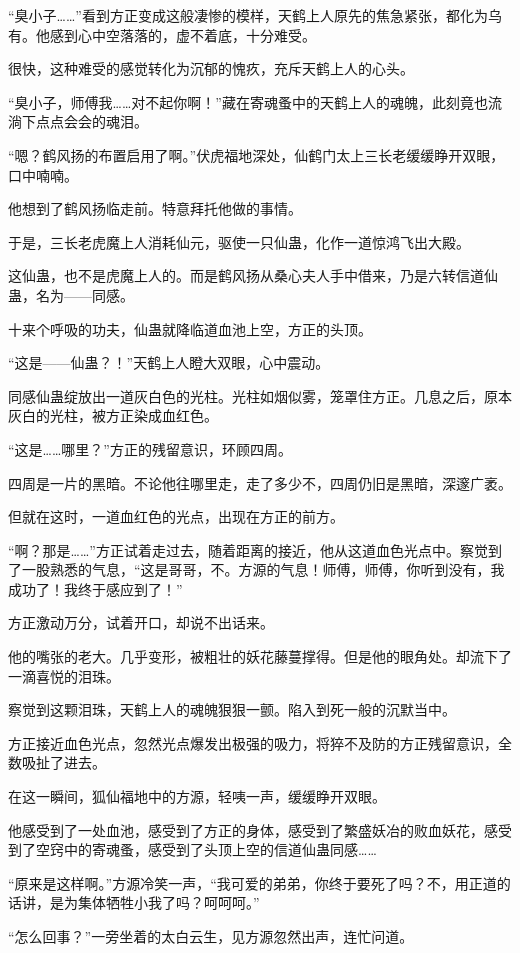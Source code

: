 \begin{this_body}
“臭小子……”看到方正变成这般凄惨的模样，天鹤上人原先的焦急紧张，都化为乌有。他感到心中空落落的，虚不着底，十分难受。

很快，这种难受的感觉转化为沉郁的愧疚，充斥天鹤上人的心头。

“臭小子，师傅我……对不起你啊！”藏在寄魂蚤中的天鹤上人的魂魄，此刻竟也流淌下点点会会的魂泪。

“嗯？鹤风扬的布置启用了啊。”伏虎福地深处，仙鹤门太上三长老缓缓睁开双眼，口中喃喃。

他想到了鹤风扬临走前。特意拜托他做的事情。

于是，三长老虎魔上人消耗仙元，驱使一只仙蛊，化作一道惊鸿飞出大殿。

这仙蛊，也不是虎魔上人的。而是鹤风扬从桑心夫人手中借来，乃是六转信道仙蛊，名为——同感。

十来个呼吸的功夫，仙蛊就降临道血池上空，方正的头顶。

“这是——仙蛊？！”天鹤上人瞪大双眼，心中震动。

同感仙蛊绽放出一道灰白色的光柱。光柱如烟似雾，笼罩住方正。几息之后，原本灰白的光柱，被方正染成血红色。

“这是……哪里？”方正的残留意识，环顾四周。

四周是一片的黑暗。不论他往哪里走，走了多少不，四周仍旧是黑暗，深邃广袤。

但就在这时，一道血红色的光点，出现在方正的前方。

“啊？那是……”方正试着走过去，随着距离的接近，他从这道血色光点中。察觉到了一股熟悉的气息，“这是哥哥，不。方源的气息！师傅，师傅，你听到没有，我成功了！我终于感应到了！”

方正激动万分，试着开口，却说不出话来。

他的嘴张的老大。几乎变形，被粗壮的妖花藤蔓撑得。但是他的眼角处。却流下了一滴喜悦的泪珠。

察觉到这颗泪珠，天鹤上人的魂魄狠狠一颤。陷入到死一般的沉默当中。

方正接近血色光点，忽然光点爆发出极强的吸力，将猝不及防的方正残留意识，全数吸扯了进去。

在这一瞬间，狐仙福地中的方源，轻咦一声，缓缓睁开双眼。

他感受到了一处血池，感受到了方正的身体，感受到了繁盛妖冶的败血妖花，感受到了空窍中的寄魂蚤，感受到了头顶上空的信道仙蛊同感……

“原来是这样啊。”方源冷笑一声，“我可爱的弟弟，你终于要死了吗？不，用正道的话讲，是为集体牺牲小我了吗？呵呵呵。”

“怎么回事？”一旁坐着的太白云生，见方源忽然出声，连忙问道。


\end{this_body}
